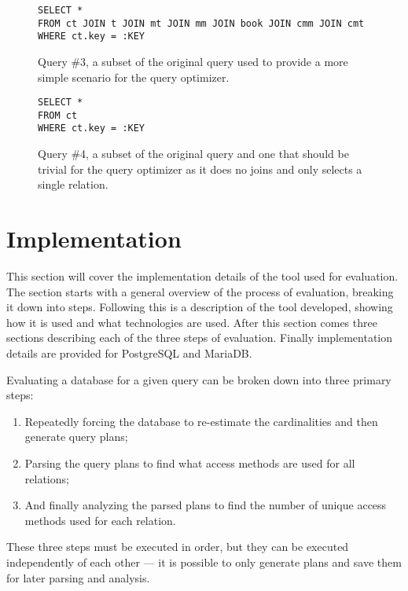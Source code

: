 \begin{figure}[ht]
\begin{verbatim}
SELECT *
FROM ct JOIN t JOIN mt JOIN mm JOIN book JOIN cmm JOIN cmt
WHERE ct.key = :KEY
\end{verbatim}
  \caption[Query \#3, used for the second evaluation]{Query \#3, a subset of the
  original query used to provide a more simple scenario for the query
  optimizer.}\label{fig:sql:query3}
\end{figure}

\begin{figure}[ht]
\begin{verbatim}
SELECT *
FROM ct
WHERE ct.key = :KEY
\end{verbatim}
  \caption[Query \#4, used for the second evaluation]{Query \#4, a subset of the
  original query and one that should be trivial for the query optimizer as it
  does no joins and only selects a single relation.}\label{fig:sql:query4}
\end{figure}


\section{Implementation}\label{sec:implementation}
This section will cover the implementation details of the tool used for
evaluation. The section starts with a general overview of the process of
evaluation, breaking it down into steps. Following this is a description of the
tool developed, showing how it is used and what technologies are used. After
this section comes three sections describing each of the three steps of evaluation.
Finally implementation details are provided for PostgreSQL and MariaDB.\@

Evaluating a database for a given query can be broken down into three primary
steps:
\begin{enumerate}
\item Repeatedly forcing the database to re-estimate the cardinalities and then
  generate query plans;
\item Parsing the query plans to find what access methods are used for all
  relations;
\item And finally analyzing the parsed plans to find the number of unique access
  methods used for each relation.
\end{enumerate}

These three steps must be executed in order, but they can be executed
independently of each other --- it is possible to only generate plans and save
them for later parsing and analysis.

